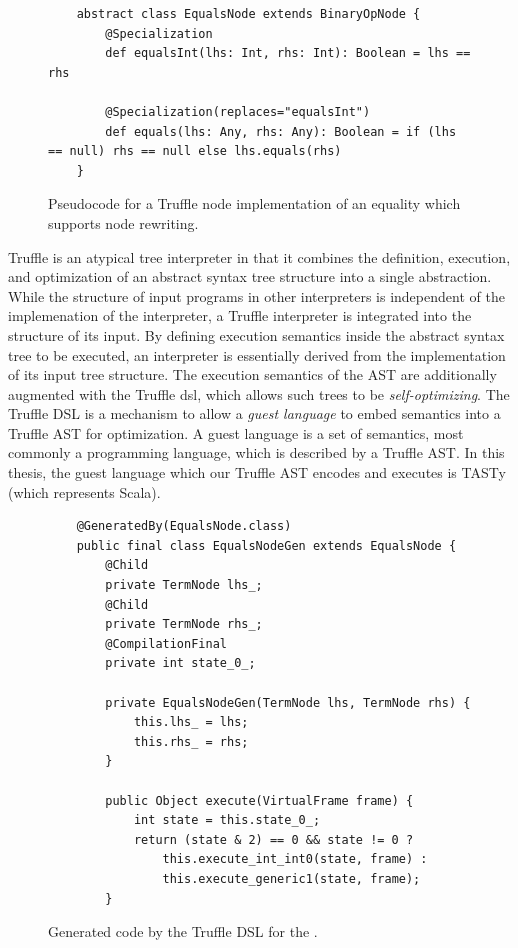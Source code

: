 \begin{figure}[!htb]
	\begin{verbatim}
	abstract class EqualsNode extends BinaryOpNode {
		@Specialization
		def equalsInt(lhs: Int, rhs: Int): Boolean = lhs == rhs
		
		@Specialization(replaces="equalsInt")
		def equals(lhs: Any, rhs: Any): Boolean = if (lhs == null) rhs == null else lhs.equals(rhs)
	}
	\end{verbatim}
	\caption{Pseudocode for a Truffle node implementation of an equality which supports node rewriting.}
	\label{example:node-rewriting}
\end{figure}

Truffle is an atypical tree interpreter in that it combines the definition, execution, and optimization of an abstract syntax tree structure into a single abstraction.
While the structure of input programs in other interpreters is independent of the implemenation of the interpreter, a Truffle interpreter is integrated into the structure of its input.
By defining execution semantics inside the abstract syntax tree to be executed, an interpreter is essentially derived from the implementation of its input tree structure.
The execution semantics of the AST are additionally augmented with the Truffle \acrfull{dsl}, which allows such trees to be \textit{self-optimizing}.
The Truffle DSL is a mechanism to allow a \textit{guest language} to embed semantics into a Truffle AST for optimization.
A guest language is a set of semantics, most commonly a programming language, which is described by a Truffle AST.
In this thesis, the guest language which our Truffle AST encodes and executes is TASTy (which represents Scala).

\begin{figure}[!htb]
\begin{verbatim}
	@GeneratedBy(EqualsNode.class)
	public final class EqualsNodeGen extends EqualsNode {
		@Child
		private TermNode lhs_;
		@Child
		private TermNode rhs_;
		@CompilationFinal
		private int state_0_;
		
		private EqualsNodeGen(TermNode lhs, TermNode rhs) {
			this.lhs_ = lhs;
			this.rhs_ = rhs;
		}
		
		public Object execute(VirtualFrame frame) {
			int state = this.state_0_;
			return (state & 2) == 0 && state != 0 ? 
				this.execute_int_int0(state, frame) : 
				this.execute_generic1(state, frame);
		}
\end{verbatim}
\caption{Generated code by the Truffle DSL for the .}
\label{impl:node-rewriting-gen}
\end{figure}

